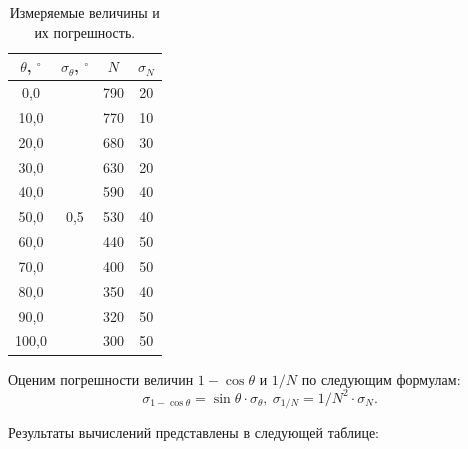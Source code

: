 \documentclass[a4paper,12pt]{article} %
\begin{document}
		\begin{table}[H]
			\label{table:parametr}
			\begin{tabular}{|c|c|c|c|}
				\hline
				$\theta$, $^\circ$ & $\sigma_\theta$, $^\circ$ & $N$ & $\sigma_N$ \\ \hline
				0,0                & \multirow{11}{*}{0,5}     & 790 & 20         \\ \cline{1-1} \cline{3-4} 
				10,0               &                           & 770 & 10         \\ \cline{1-1} \cline{3-4} 
				20,0               &                           & 680 & 30         \\ \cline{1-1} \cline{3-4} 
				30,0               &                           & 630 & 20         \\ \cline{1-1} \cline{3-4} 
				40,0               &                           & 590 & 40         \\ \cline{1-1} \cline{3-4} 
				50,0               &                           & 530 & 40         \\ \cline{1-1} \cline{3-4} 
				60,0               &                           & 440 & 50         \\ \cline{1-1} \cline{3-4} 
				70,0               &                           & 400 & 50         \\ \cline{1-1} \cline{3-4} 
				80,0               &                           & 350 & 40         \\ \cline{1-1} \cline{3-4} 
				90,0               &                           & 320 & 50         \\ \cline{1-1} \cline{3-4} 
				100,0              &                           & 300 & 50         \\ \hline
			\end{tabular}
			\caption{Измеряемые величины и их погрешность.}
		\end{table}
	
	

		
		Оценим погрешности величин $1 - \cos \theta$ и $1/N$ по следующим формулам:
		\begin{equation*}
			\sigma_{1-\cos \theta} = \sin \theta \cdot \sigma_\theta, \ \sigma_{1/N} = 1/N^2 \cdot \sigma_N.
		\end{equation*}
			
		Результаты вычислений представлены в следующей таблице:
			
\end{document}
